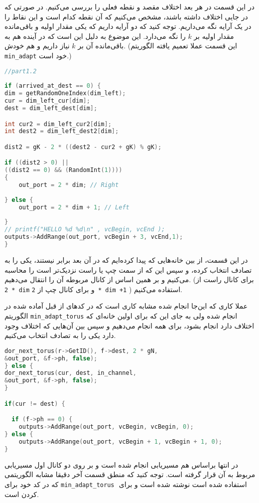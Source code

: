 در این قسمت در هر بعد اختلاف مقصد و نقطه فعلی را بررسی می‌کنیم. در صورتی که در جایی اختلاف داشته باشند، مشخص می‌کنیم که آن نقطه کدام است و این نقاط را در یک آرایه نگه می‌داریم. توجه کنید که دو آرایه داریم که یکی مقدار اولیه و باقی‌مانده مقدار اولیه بر $k$ را نگه می‌دارد. این موضوع به دلیل این است که در آینده هم به باقی‌مانده آن بر $k$ نیاز داریم و هم خودش. (این قسمت عملا تعمیم یافته الگوریتم \verb*|min_adapt| خود  است.)



\begin{latin}
	\begin{lstlisting}[language = c++]
//part1.2
		
if (arrived_at_dest == 0) {
dim = getRandomOneIndex(dim_left);
cur = dim_left_cur[dim];
dest = dim_left_dest[dim];

int cur2 = dim_left_cur2[dim];
int dest2 = dim_left_dest2[dim];

dist2 = gK - 2 * ((dest2 - cur2 + gK) % gK);

if ((dist2 > 0) ||
((dist2 == 0) && (RandomInt(1))))
{
	out_port = 2 * dim; // Right
	
} else {
	out_port = 2 * dim + 1; // Left
	
}
// printf("HELLO %d %d\n" , vcBegin, vcEnd );
outputs->AddRange(out_port, vcBegin + 3, vcEnd,1);
}
	\end{lstlisting}
\end{latin}


در این قسمت، از بین خانه‌هایی که پیدا کرده‌ایم که در آن بعد برابر نیستند، یکی را به تصادف انتخاب کرده، و سپس این که از سمت چپ یا راست  نزدیک‌تر است را محاسبه می‌کنیم و بر همین اساس از کانال مربوطه آن را انتقال می‌دهیم. (برای کانال راست از 
\verb*|2 * dim|
و برای کانال چپ از
\verb*|2 * dim +1|
)
استفاده می‌کنیم.



عملا کاری که این‌جا انجام شده مشابه کاری است که در کدهای از قبل آماده شده  در الگوریتم \verb*|min_adapt_torus| انجام شده ولی به جای این که برای اولین خانه‌ای که اختلاف دارد انجام بشود، برای همه انجام می‌دهیم و سپس بین آن‌هایی که اختلاف وجود دارد یکی را به تصادف انتخاب می‌کنیم.


\begin{latin}
	\begin{lstlisting}[language = c++]
   dor_next_torus(r->GetID(), f->dest, 2 * gN,
&out_port, &f->ph, false);
} else {
dor_next_torus(cur, dest, in_channel,
&out_port, &f->ph, false);
}

if(cur != dest) {

  if (f->ph == 0) {
	outputs->AddRange(out_port, vcBegin, vcBegin, 0);
} else {
	outputs->AddRange(out_port, vcBegin + 1, vcBegin + 1, 0);
}

	\end{lstlisting}
\end{latin}


در انتها براساس  هم مسیریابی انجام شده است و بر روی دو کانال اول مسیریابی مربوط به آن قرار گرفته است.  توجه کنید که منطق قسمت آخر دقیقا مشابه الگوریتمی که در کد خود  برای \verb*|min_adapt_torus| استفاده شده است نوشته شده است و برای ‌ کردن است.









